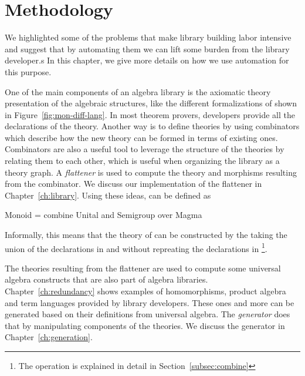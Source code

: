 \chapter{Methodology}
\label{ch:design}

We highlighted some of the problems that make library building labor intensive and suggest that by automating them we can lift some burden from the library developer.s In this chapter, we give more details on how we use automation for this purpose. 

One of the main components of an algebra library is the axiomatic theory presentation of the algebraic structures, like the different formalizations of  shown in Figure~\ref{fig:mon-diff-lang}. In most theorem provers, developers provide all the declarations of the theory. Another way is to define theories by using combinators which describe how the new theory can be formed in terms of existing ones. 
Combinators are also a useful tool to leverage the structure of the theories by relating them to each other, which is useful when organizing the library as a theory graph. A \emph{flattener} is used to compute the theory and morphisms resulting from the combinator. We discuss our implementation of the flattener in Chapter~\ref{ch:library}. Using these ideas,  can be defined as 
\begin{togcode} 
Monoid = combine Unital and Semigroup over Magma
\end{togcode} 
Informally, this means that the theory of  can be constructed by the taking the union of the declarations in   and  without repreating the declarations in \footnote{The  operation is explained in detail in Section~\ref{subsec:combine}}. 

The theories resulting from the flattener are used to compute some universal algebra constructs that are also part of algebra libraries. Chapter~\ref{ch:redundancy} shows examples of homomorphisms, product algebra and term languages provided by library developers. These ones and more can be generated based on their definitions from universal algebra. The \emph{generator} does that by manipulating components of the theories. We discuss the generator in Chapter~\ref{ch:generation}. 

